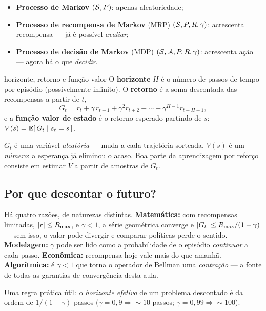 \documentclass[11pt, a4paper]{article}
\newcommand{\Rmax}{R_{\max}}
\begin{document}
\begin{itemize}
  \item \textbf{Processo de Markov} $(\mathcal{S}, P)$: apenas aleatoriedade;
  \item \textbf{Processo de recompensa de Markov} (MRP) $(\mathcal{S}, P, R, \gamma)$:
        acrescenta recompensa --- já é possível \emph{avaliar};
  \item \textbf{Processo de decisão de Markov} (MDP) $(\mathcal{S}, \mathcal{A}, P, R, \gamma)$:
        acrescenta ação --- agora há o que \emph{decidir}.
\end{itemize}

\begin{defbox}{horizonte, retorno e função valor}
O \textbf{horizonte} $H$ é o número de passos de tempo por episódio (possivelmente
infinito). O \textbf{retorno} é a soma descontada das recompensas a partir de $t$,
\[
  G_t = r_t + \gamma\, r_{t+1} + \gamma^2 r_{t+2} + \cdots + \gamma^{H-1} r_{t+H-1},
\]
e a \textbf{função valor de estado} é o retorno esperado partindo de $s$:
$V(s) = \mathbb{E}[\, G_t \mid s_t = s\,]$.
\end{defbox}

\begin{ideiabox}
$G_t$ é uma variável \emph{aleatória} --- muda a cada trajetória sorteada. $V(s)$ é um
\emph{número}: a esperança já eliminou o acaso. Boa parte da aprendizagem por reforço
consiste em estimar $V$ a partir de amostras de $G_t$.
\end{ideiabox}

\subsection{Por que descontar o futuro?}

Há quatro razões, de naturezas distintas. \textbf{Matemática:} com recompensas limitadas,
$\abs{r} \le \Rmax$, e $\gamma < 1$, a série geométrica converge e
$\abs{G_t} \le \Rmax/(1-\gamma)$ --- sem isso, o valor pode divergir e comparar políticas
perde o sentido. \textbf{Modelagem:} $\gamma$ pode ser lido como a probabilidade de o
episódio \emph{continuar} a cada passo. \textbf{Econômica:} recompensa hoje vale mais do
que amanhã. \textbf{Algorítmica:} é $\gamma<1$ que torna o operador de Bellman uma
\emph{contração} --- a fonte de todas as garantias de convergência desta aula.

Uma regra prática útil: o \emph{horizonte efetivo} de um problema descontado é da ordem
de $1/(1-\gamma)$ passos ($\gamma=0{,}9 \Rightarrow{} \sim 10$ passos;
$\gamma = 0{,}99 \Rightarrow{} \sim 100$).
\end{document}
